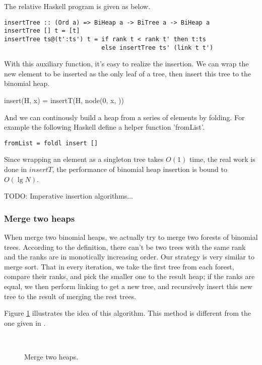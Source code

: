 \documentclass{article}
\begin{document}
The relative Haskell program is given as below.

\begin{lstlisting}
insertTree :: (Ord a) => BiHeap a -> BiTree a -> BiHeap a
insertTree [] t = [t]
insertTree ts@(t':ts') t = if rank t < rank t' then t:ts
                           else insertTree ts' (link t t')
\end{lstlisting}

With this auxiliary function, it's easy to realize the insertion.
We can wrap the new element to be inserted as the only leaf of a tree,
then insert this tree to the binomial heap.

\be
insert(H, x) = insertT(H, node(0, x, \phi))
\ee

And we can continously build a heap from a series of elements by folding.
For example the following Haskell define a helper function 'fromList'.

\begin{lstlisting}
fromList = foldl insert []
\end{lstlisting}

Since wrapping an element as a singleton tree takes $O(1)$ time, 
the real work is done in $insertT$, the performance of binomial
heap insertion is bound to $O(\lg N)$.

TODO: Imperative insertion algorithms...


\subsubsection{Merge two heaps}
When merge two binomial heaps, we actually try to merge two forests
of binomial trees. According to the definition, there can't be
two trees with the same rank and the ranks are in monotically increasing
order. Our strategy is very similar to merge sort. That in every iteration,
we take the first tree from each forest, compare their ranks, 
and pick the smaller one to the result heap; if the ranks are
equal, we then perform linking to get a new tree, and recursively
insert this new tree to the result of merging the rest trees.

Figure \ref{fig:merge-bheaps} illustrates the idea of this algorithm. This 
method is different from the one given in \cite{CLRS}.

\begin{figure}[htbp]
  \centering
   \\
  \caption{Merge two heaps.} \label{fig:merge-bheaps}
\end{figure}
\end{document}
